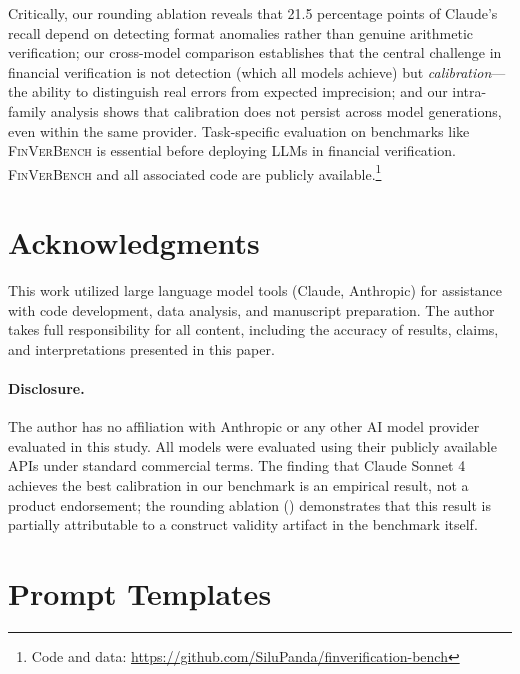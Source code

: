 \documentclass[11pt]{article}
\newcommand{\benchmark}{\textsc{FinVerBench}}
\begin{document}
Critically, our rounding ablation reveals that 21.5 percentage points of Claude's recall depend on detecting format anomalies rather than genuine arithmetic verification; our cross-model comparison establishes that the central challenge in financial verification is not detection (which all models achieve) but \emph{calibration}---the ability to distinguish real errors from expected imprecision; and our intra-family analysis shows that calibration does not persist across model generations, even within the same provider.
Task-specific evaluation on benchmarks like \benchmark{} is essential before deploying LLMs in financial verification.
\benchmark{} and all associated code are publicly available.\footnote{Code and data: \url{https://github.com/SiluPanda/finverification-bench}}

\section*{Acknowledgments}
This work utilized large language model tools (Claude, Anthropic) for assistance with code development, data analysis, and manuscript preparation.
The author takes full responsibility for all content, including the accuracy of results, claims, and interpretations presented in this paper.

\paragraph{Disclosure.}
The author has no affiliation with Anthropic or any other AI model provider evaluated in this study.
All models were evaluated using their publicly available APIs under standard commercial terms.
The finding that Claude Sonnet 4 achieves the best calibration in our benchmark is an empirical result, not a product endorsement; the rounding ablation () demonstrates that this result is partially attributable to a construct validity artifact in the benchmark itself.




\appendix
\section{Prompt Templates}
\label{app:prompts}
\end{document}
